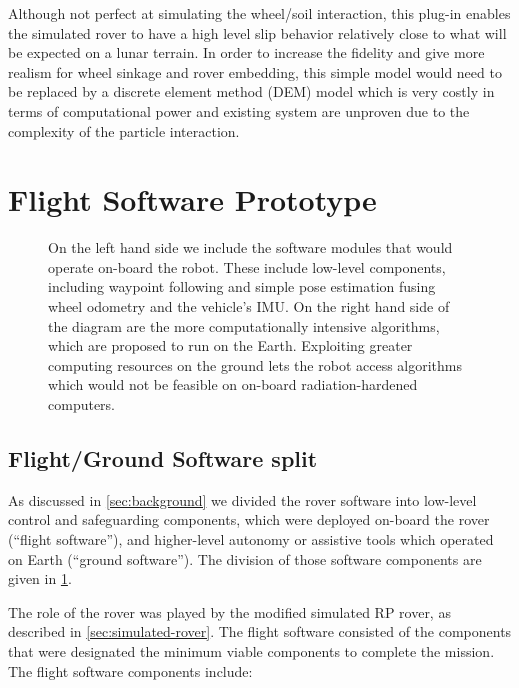 \documentclass[twocolumn,letterpaper]{IEEEAerospaceCLS}  %
\begin{document}
Although not perfect at simulating the wheel/soil interaction, this plug-in enables the simulated rover to have a high level slip behavior relatively close to what will be expected on a lunar terrain. In order to increase the fidelity and give more realism for wheel sinkage and rover embedding, this simple model would need to be replaced by a discrete element method (DEM) model which is very costly in terms of computational power and existing system are unproven due to the complexity of the particle interaction.

\section{Flight Software Prototype}

\begin{figure}
\centering
{}
\caption{On the left hand side we include the software modules that would operate on-board the robot.  These include low-level components, including waypoint following and simple pose estimation fusing wheel odometry and the vehicle's IMU.  On the right hand side of the diagram are the more computationally intensive algorithms, which are proposed to run on the Earth.  Exploiting greater computing resources on the ground lets the robot access algorithms which would not be feasible on on-board radiation-hardened computers. \label{fig:rp-software}}
\end{figure}


\subsection{Flight/Ground Software split}

As discussed in \cref{sec:background} we divided the rover software into low-level control and safeguarding components, which were deployed on-board the rover (``flight software''), and higher-level autonomy or assistive tools which operated on Earth (``ground software'').  The division of those software components are given in \cref{fig:rp-software}.   

The role of the rover was played by the modified simulated RP rover, as described in \cref{sec:simulated-rover}.  The flight software consisted of the components that were designated the minimum viable components to complete the mission.  The flight software components include:
\end{document}
